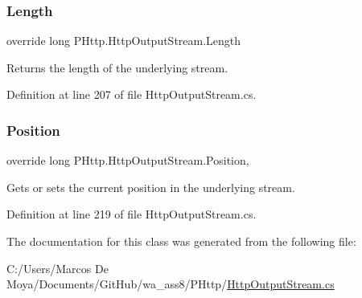 \subsubsection{\texorpdfstring{Length}{Length}}
{\footnotesize\ttfamily override long P\+Http.\+Http\+Output\+Stream.\+Length\hspace{0.3cm}{\ttfamily [get]}}



Returns the length of the underlying stream. 



Definition at line 207 of file Http\+Output\+Stream.\+cs.

\mbox{\label{class_p_http_1_1_http_output_stream_a1903fe514b1ed10c401645cef861d9c2}} 
\subsubsection{\texorpdfstring{Position}{Position}}
{\footnotesize\ttfamily override long P\+Http.\+Http\+Output\+Stream.\+Position\hspace{0.3cm}{\ttfamily [get]}, {\ttfamily [set]}}



Gets or sets the current position in the underlying stream. 



Definition at line 219 of file Http\+Output\+Stream.\+cs.



The documentation for this class was generated from the following file\+:\begin{DoxyCompactItemize}
\item 
C\+:/\+Users/\+Marcos De Moya/\+Documents/\+Git\+Hub/wa\+\_\+ass8/\+P\+Http/\hyperlink{_http_output_stream_8cs}{Http\+Output\+Stream.\+cs}\end{DoxyCompactItemize}
